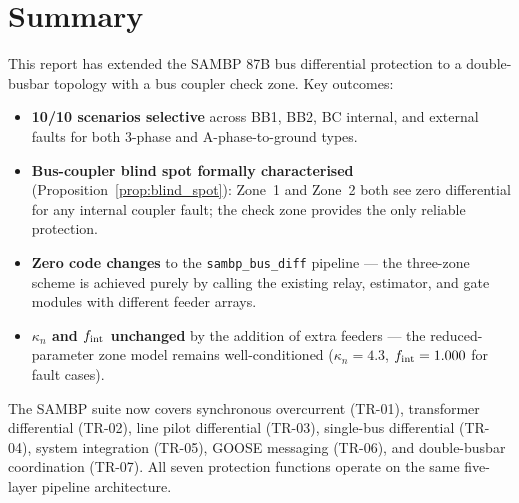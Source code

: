 \documentclass[12pt,a4paper]{article}
\newcommand{\kn}{\kappa_n}
\newcommand{\fint}{f_{\rm int}}
\begin{document}
\section{Summary}

This report has extended the SAMBP 87B bus differential protection to a
double-busbar topology with a bus coupler check zone.  Key outcomes:

\begin{itemize}
  \item \textbf{10/10 scenarios selective} across BB1, BB2, BC internal,
    and external faults for both 3-phase and A-phase-to-ground types.
  \item \textbf{Bus-coupler blind spot formally characterised}
    (Proposition~\ref{prop:blind_spot}): Zone~1 and Zone~2 both see
    zero differential for any internal coupler fault; the check zone
    provides the only reliable protection.
  \item \textbf{Zero code changes} to the \texttt{sambp\_bus\_diff}
    pipeline --- the three-zone scheme is achieved purely by calling the
    existing relay, estimator, and gate modules with different feeder
    arrays.
  \item \textbf{$\kn$ and $\fint$ unchanged} by the addition of extra
    feeders --- the reduced-parameter zone model remains well-conditioned
    ($\kn = 4.3$, $\fint = 1.000$ for fault cases).
\end{itemize}

The SAMBP suite now covers synchronous overcurrent (TR-01), transformer
differential (TR-02), line pilot differential (TR-03), single-bus
differential (TR-04), system integration (TR-05), GOOSE messaging
(TR-06), and double-busbar coordination (TR-07).  All seven protection
functions operate on the same five-layer pipeline architecture.



\end{document}
